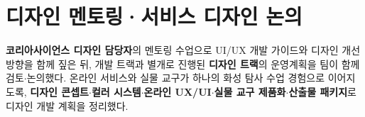 \section{디자인 멘토링·서비스 디자인 논의}
\textbf{코리아사이언스 디자인 담당자}의 멘토링 수업으로 UI/UX 개발 가이드와 디자인 개선
방향을 함께 짚은 뒤, 개발 트랙과 별개로 진행된 \textbf{디자인 트랙}의 운영계획을 팀이 함께 검토$\cdot$논의했다.
온라인 서비스와 실물 교구가 하나의 화성 탐사 수업 경험으로 이어지도록, \textbf{디자인
콘셉트$\cdot$컬러 시스템$\cdot$온라인 UX/UI$\cdot$실물 교구 제품화$\cdot$산출물 패키지}로
디자인 개발 계획을 정리했다.

\smallskip
\noindent{}  %

